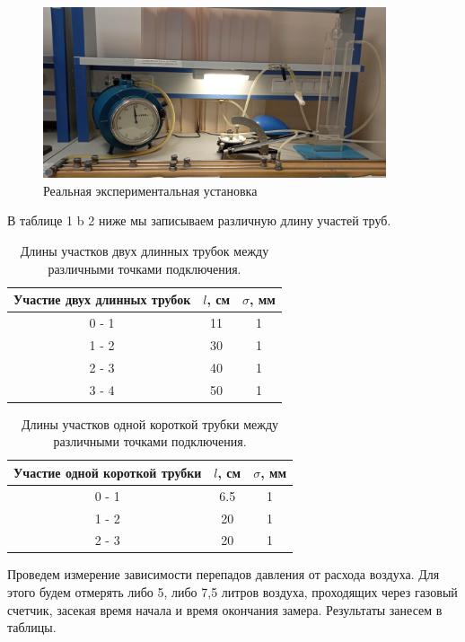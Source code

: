\documentclass[a4paper, 12pt]{article}%
\begin{document}
\begin{figure}[h]
\begin{center}
\includegraphics[width = 0.9\textwidth]{fig3.jpg}
\caption{Реальная экспериментальная установка}
\end{center}
\end{figure}
В таблице 1 b 2 ниже мы записываем различную длину участей труб.

\begin{table}[h!]
\centering
\begin{tabular}{|c|c|c|}
\hline
Участие двух длинных трубок & $l$, см & $\sigma$, мм \\ \hline
0 - 1                 & 11      & 1            \\ \hline
1 - 2                 & 30      & 1            \\ \hline
2 - 3                 & 40      & 1            \\ \hline
3 - 4                 & 50      & 1            \\ \hline
\end{tabular}
\caption{Длины участков двух длинных трубок между различными точками подключения.}
\label{tab:second_tube_parametrs}
\end{table}

\begin{table}[h!]
\centering
\begin{tabular}{|c|c|c|}
\hline
Участие одной короткой трубки & $l$, см & $\sigma$, мм \\ \hline
0 - 1                 & 6.5      & 1            \\ \hline
1 - 2                 & 20      & 1            \\ \hline
2 - 3                 & 20      & 1            \\ \hline
\end{tabular}
\caption{Длины участков одной короткой трубки между различными точками подключения.}
\label{tab:second_tube_parametrs}
\end{table}
Проведем измерение зависимости перепадов давления от расхода воздуха. Для этого будем отмерять либо 5, либо 7,5 литров воздуха, проходящих через газовый счетчик, засекая время начала и время окончания замера. Результаты занесем в таблицы.
\end{document}
